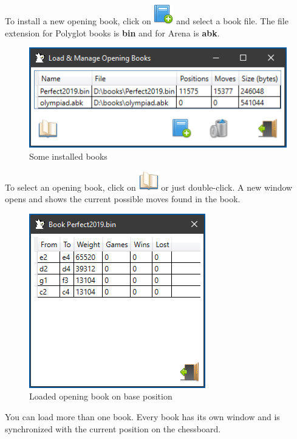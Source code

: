 \documentclass[11pt,a4paper]{article}
\begin{document}
To install a new opening book, click on \includegraphics[scale=0.5]{book_add.png} and select a book file. The file extension for Polyglot books is \textbf{bin} and for Arena is \textbf{abk}.

\begin{figure}[H]
	\centering
	\includegraphics[scale=1.0]{LoadManageBooks3.png}
	\caption{Some installed books }
	\label{fig:LoadManageBooks3}
\end{figure}

To select an opening book, click on \includegraphics[scale=0.5]{book_open.png} or just double-click. 
A new window opens and shows the current possible moves found in the book.

\begin{figure}[H]
	\centering
	\includegraphics[scale=1.0]{OpeningBook.png}
	\caption{Loaded opening book on base position }
	\label{fig:OpeningBook}
\end{figure}

You can load more than one book. Every book has its own window and is synchronized with the current position on the chessboard.
\end{document}
